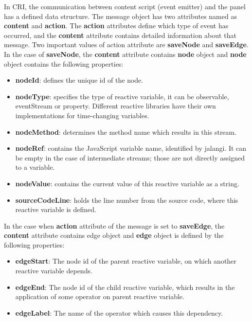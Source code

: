 In CRI, the communication between content script (event emitter) and the panel has a defined data structure. 
The message object has two attributes named as \textbf{content} and \textbf{action}.
The \textbf{action} attributes define which type of event has occurred, and the \textbf{content} attribute contains detailed information about that message. Two important values of action attribute are \textbf{saveNode} and \textbf{saveEdge}.\\
In the case of \textbf{saveNode}, the \textbf{content} attribute contains \textbf{node} object and \textbf{node} object contains the following properties:\\
\begin{itemize}
\item \textbf{nodeId}: defines the unique id of the node.
\item \textbf{nodeType}: specifies the type of reactive variable, it can be observable, eventStream or property. Different reactive libraries have their own implementations for time-changing variables.
\item \textbf{nodeMethod}: determines the method name which results in this stream.
\item \textbf{nodeRef}: contains the JavaScript variable name, identified by jalangi. It can be empty in the case of intermediate streams; those are not directly assigned to a variable.
\item \textbf{nodeValue}: contains the current value of this reactive variable as a string.
\item \textbf{sourceCodeLine}: holds the line number from the source code, where this reactive variable is defined.
\end{itemize}
In the case when \textbf{action} attribute of the message is set to \textbf{saveEdge}, the \textbf{content} attribute contains edge object and \textbf{edge} object is defined by the following properties:\\
\begin{itemize}
\item \textbf{edgeStart}: The node id of the parent reactive variable, on which another reactive variable depends.
\item \textbf{edgeEnd}: The node id of the child reactive variable, which results in the application of some operator on parent reactive variable.
\item \textbf{edgeLabel}: The name of the operator which causes this dependency.
\end{itemize}

